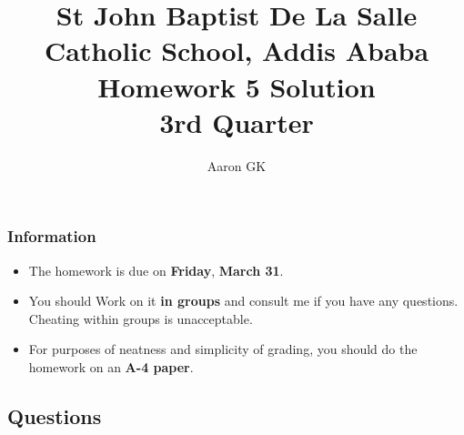 \documentclass[9pt,addpoints]{exam}
\author{Aaron GK}
\begin{document}
	\title{St John Baptist De La Salle Catholic School, Addis Ababa\\
		\large Homework 5 Solution\\
		3rd Quarter}
	\maketitle
	\begin{center}
		\subsubsection*{Information}
		\begin{itemize}
			\item The homework is due on \textbf{Friday}, \textbf{March 31}.
			\item You should Work on it \textbf{in groups} and consult me if you have any questions. Cheating within groups is unacceptable.
			\item For purposes of neatness and simplicity of grading, you should do the homework on an \textbf{A-4 paper}.
		\end{itemize}
	\end{center}
	\begin{center}
		\subsection*{Questions}
	\end{center}
\end{document}
